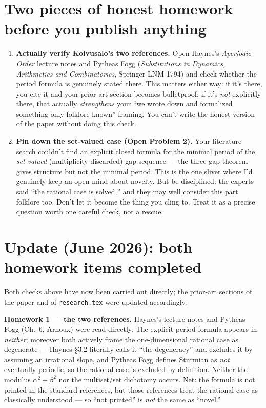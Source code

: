 \documentclass[11pt,a4paper]{article}
\begin{document}
\section*{Two pieces of honest homework before you publish anything}

\begin{enumerate}[leftmargin=*]
  \item \textbf{Actually verify Koivusalo's two references.} Open Haynes's
  \emph{Aperiodic Order} lecture notes and Pytheas Fogg (\emph{Substitutions in
  Dynamics, Arithmetics and Combinatorics}, Springer LNM 1794) and check
  whether the period formula is genuinely stated there. This matters either
  way: if it's there, you cite it and your prior-art section becomes
  bulletproof; if it's \emph{not} explicitly there, that actually
  \emph{strengthens} your ``we wrote down and formalized something only
  folklore-known'' framing. You can't write the honest version of the paper
  without doing this check.

  \item \textbf{Pin down the set-valued case (Open Problem 2).} Your literature
  search couldn't find an explicit closed formula for the minimal period of the
  \emph{set-valued} (multiplicity-discarded) gap sequence --- the three-gap
  theorem gives structure but not the minimal period. This is the one sliver
  where I'd genuinely keep an open mind about novelty. But be disciplined: the
  experts said ``the rational case is solved,'' and they may well consider this
  part folklore too. Don't let it become the thing you cling to. Treat it as a
  precise question worth one careful check, not a rescue.
\end{enumerate}

\section*{Update (June 2026): both homework items completed}

Both checks above have now been carried out directly; the prior-art sections of
the paper and of \texttt{research.tex} were updated accordingly.

\textbf{Homework 1 --- the two references.} Haynes's lecture notes and Pytheas
Fogg (Ch.~6, Arnoux) were read directly. The explicit period formula appears in
\emph{neither}; moreover both actively frame the one-dimensional rational case
as degenerate --- Haynes \S3.2 literally calls it ``the degeneracy'' and
excludes it by assuming an irrational slope, and Pytheas Fogg defines Sturmian
as \emph{not} eventually periodic, so the rational case is excluded by
definition. Neither the modulus $\alpha^2+\beta^2$ nor the multiset/set
dichotomy occurs. Net: the formula is not printed in the standard references,
but those references treat the rational case as classically understood --- so
``not printed'' is \emph{not} the same as ``novel.''
\end{document}
